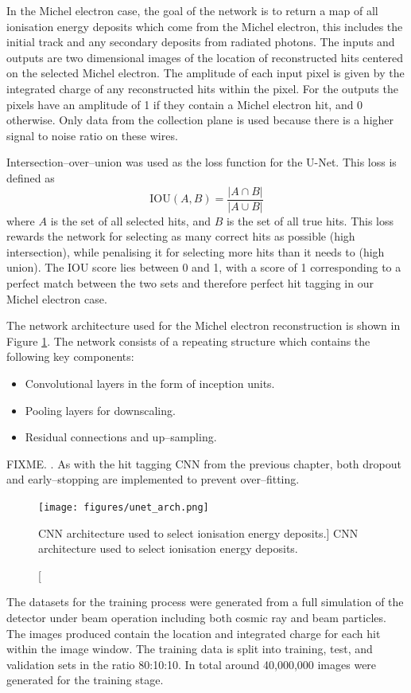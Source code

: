 In the Michel electron case, the goal of the network is to return a map of all
ionisation energy deposits which come from the Michel electron, this includes
the initial track and any secondary deposits from radiated photons. The inputs
and outputs are two dimensional images of the location of reconstructed hits
centered on the selected Michel electron. The amplitude of each input pixel is 
given by the integrated charge of any reconstructed hits within the pixel. For
the outputs the pixels have an amplitude of 1 if they contain a Michel electron
hit, and 0 otherwise. Only data from the collection plane is used because there 
is a higher signal to noise ratio on these wires. 

Intersection--over--union was used as the loss function for the U-Net. This loss
is defined as 
\begin{equation}
	\mbox{IOU}(A, B) = \frac{|A \cap B|}{|A \cup B|}
\end{equation}
where $A$ is the set of all selected hits, and $B$ is the set of all true hits.
This loss rewards the network for selecting as many correct hits as possible
(high intersection), while penalising it for selecting more hits than it needs
to (high union). The IOU score lies between 0 and 1, with a score of 1
corresponding to a perfect match between the two sets and therefore perfect hit
tagging in our Michel electron case.

The network architecture used for the Michel electron reconstruction is shown in
Figure \ref{fig:unet_arch}. The network consists of a repeating structure which
contains the following key components:
\begin{itemize}
	\item Convolutional layers in the form of inception units.
	\item Pooling layers for downscaling.
	\item Residual connections and up--sampling.
\end{itemize}
FIXME. . As with the hit tagging CNN from the previous chapter, 
both dropout and early--stopping are implemented to prevent over--fitting.
\begin{figure}
	\centering
	\texttt{[image: figures/unet\_arch.png]}
	\caption
	[CNN architecture used to select ionisation energy deposits.]
	{CNN architecture used to select ionisation energy deposits.}
	\label{fig:unet_arch}
\end{figure}

The datasets for the training process were generated from a full simulation of 
the \protodune{} detector under beam operation including both cosmic ray and
beam particles. The images produced contain the location and integrated charge
for each hit within the image window. The training data is split into training, 
test, and validation sets in the ratio 80:10:10. In total around 40,000,000 
images were generated for the training stage.

